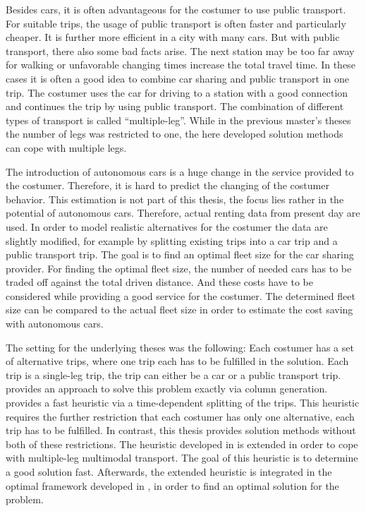 Besides cars, it is often advantageous for the costumer to use public transport. For suitable trips, the usage of public transport is often faster and particularly cheaper. It is further more efficient in a city with many cars. But with public transport, there also some bad facts arise. The next station may be too far away for walking or unfavorable changing times increase the total travel time. In these cases it is often a good idea to combine car sharing and public transport in one trip. The costumer uses the car for driving to a station with a good connection and continues the trip by using public transport. The combination of different types of transport is called \enquote{multiple-leg}. While in the previous master's theses the number of legs was restricted to one, the here developed solution methods can cope with multiple legs.

The introduction of autonomous cars is a huge change in the service provided to the costumer. Therefore, it is hard to predict the changing of the costumer behavior. This estimation is not part of this thesis, the focus lies rather in the potential of autonomous cars. Therefore, actual renting data from present day are used. In order to model realistic alternatives for the costumer the data are slightly modified, for example by splitting existing trips into a car trip and a public transport trip. The goal is to find an optimal fleet size for the car sharing provider. For finding the optimal fleet size, the number of needed cars has to be traded off against the total driven distance. And these costs have to be considered while providing a good service for the costumer. The determined fleet size can be compared to the actual fleet size in order to estimate the cost saving with autonomous cars.

The setting for the underlying theses was the following: Each costumer has a set of alternative trips, where one trip each has to be fulfilled in the solution. Each trip is a single-leg trip, \ie the trip can either be a car or a public transport trip. \cite{Kaiser} provides an approach to solve this problem exactly via column generation. \cite{Knoll} provides a fast heuristic via a time-dependent splitting of the trips. This heuristic requires the further restriction that each costumer has only one alternative, \ie each trip has to be fulfilled. In contrast, this thesis provides solution methods without both of these restrictions. The heuristic developed in \cite{Knoll} is extended in order to cope with multiple-leg multimodal transport. The goal of this heuristic is to determine a good solution fast. Afterwards, the extended heuristic is integrated in the optimal framework developed in \cite{Kaiser}, in order to find an optimal solution for the problem.
